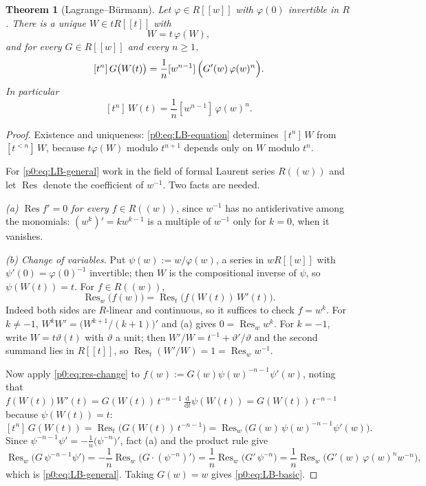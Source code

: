 \documentclass[11pt,a4paper,oneside]{book}
\theoremstyle{plain}
\newtheorem{theorem}{Theorem}[chapter]
\theoremstyle{definition}
\theoremstyle{remark}
\newcommand{\dd}{\mathrm{d}}
\newcommand{\Coef}[1]{[#1]\,}
\DeclareMathOperator{\Res}{Res}
\begin{document}
\begin{theorem}[Lagrange--B\"urmann]\label{p0:thm:LB}
Let $\varphi\in R[[w]]$ with $\varphi(0)$ invertible in $R$.  There is a unique
$W\in tR[[t]]$ with
\begin{equation}\label{p0:eq:LB-equation}
 W=t\,\varphi(W),
\end{equation}
and for every $G\in R[[w]]$ and every $n\ge1$,
\begin{equation}\label{p0:eq:LB-general}
 \Coef{t^n}G\bigl(W(t)\bigr)
 =\frac1n\Coef{w^{n-1}}\Bigl(G'(w)\,\varphi(w)^n\Bigr).
\end{equation}
In particular
\begin{equation}\label{p0:eq:LB-basic}
 \Coef{t^n}W(t)=\frac1n\Coef{w^{n-1}}\varphi(w)^n .
\end{equation}
\end{theorem}

\begin{proof}
Existence and uniqueness: \eqref{p0:eq:LB-equation} determines
$\Coef{t^n}W$ from $\Coef{t^{<n}}W$, because $t\varphi(W)$ modulo $t^{n+1}$
depends only on $W$ modulo $t^{n}$.

For \eqref{p0:eq:LB-general} work in the field of formal Laurent series
$R((w))$ and let $\Res$ denote the coefficient of $w^{-1}$.  Two facts are
needed.

\emph{(a) $\Res f'=0$ for every $f\in R((w))$}, since $w^{-1}$ has no
antiderivative among the monomials: $(w^{k})'=kw^{k-1}$ is a multiple of
$w^{-1}$ only for $k=0$, when it vanishes.

\emph{(b) Change of variables.}  Put $\psi(w):=w/\varphi(w)$, a series in
$wR[[w]]$ with $\psi'(0)=\varphi(0)^{-1}$ invertible; then $W$ is the
compositional inverse of $\psi$, so $\psi(W(t))=t$.  For $f\in R((w))$,
\begin{equation}\label{p0:eq:res-change}
 \Res_w\bigl(f(w)\bigr)=\Res_t\bigl(f(W(t))\,W'(t)\bigr).
\end{equation}
Indeed both sides are $R$-linear and continuous, so it suffices to check
$f=w^k$.  For $k\ne-1$, $W^kW'=\bigl(W^{k+1}/(k+1)\bigr)'$ and (a) gives
$0=\Res_w w^k$.  For $k=-1$, write $W=t\vartheta(t)$ with $\vartheta$ a unit;
then $W'/W=t^{-1}+\vartheta'/\vartheta$ and the second summand lies in
$R[[t]]$, so $\Res_t(W'/W)=1=\Res_ww^{-1}$.

Now apply \eqref{p0:eq:res-change} to
$f(w):=G(w)\psi(w)^{-n-1}\psi'(w)$, noting that
$f(W(t))W'(t)=G(W(t))\,t^{-n-1}\,\tfrac{\dd}{\dd t}\psi(W(t))
 =G(W(t))\,t^{-n-1}$ because $\psi(W(t))=t$:
\[
 \Coef{t^n}G(W(t))=\Res_t\bigl(G(W(t))\,t^{-n-1}\bigr)
 =\Res_w\bigl(G(w)\,\psi(w)^{-n-1}\psi'(w)\bigr).
\]
Since $\psi^{-n-1}\psi'=-\tfrac1n\bigl(\psi^{-n}\bigr)'$, fact (a) and the
product rule give
\[
 \Res_w\bigl(G\,\psi^{-n-1}\psi'\bigr)
 =-\frac1n\Res_w\bigl(G\cdot(\psi^{-n})'\bigr)
 =\frac1n\Res_w\bigl(G'\,\psi^{-n}\bigr)
 =\frac1n\Res_w\bigl(G'(w)\,\varphi(w)^{n}w^{-n}\bigr),
\]
which is \eqref{p0:eq:LB-general}.  Taking $G(w)=w$ gives
\eqref{p0:eq:LB-basic}.
\end{proof}
\end{document}

